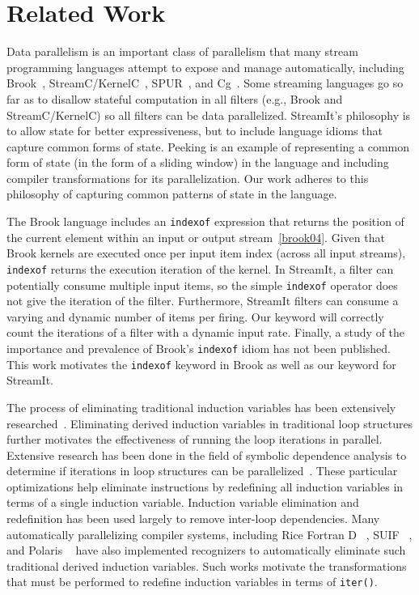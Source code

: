 \section{Related Work}
\label{sec:related}

Data parallelism is an important class of parallelism that many stream
programming languages attempt to expose and manage automatically,
including Brook~\cite{brook04}, StreamC/KernelC~\cite{imagine03ieee},
SPUR~\cite{spur05samos}, and Cg~\cite{cg03}.  Some streaming languages
go so far as to disallow stateful computation in all filters (e.g.,
Brook and StreamC/KernelC) so all filters can be data parallelized.
StreamIt's philosophy is to allow state for better expressiveness, but
to include language idioms that capture common forms of state.
Peeking is an example of representing a common form of state (in the
form of a sliding window) in the language and including compiler
transformations for its parallelization.  Our work adheres to this
philosophy of capturing common patterns of state in the language.

The Brook language includes an {\tt indexof} expression that returns
the position of the current element within an input or output
stream~\ref{brook04}.  Given that Brook kernels are executed once per
input item index (across all input streams), {\tt indexof} returns the
execution iteration of the kernel.  In StreamIt, a filter can
potentially consume multiple input items, so the simple {\tt indexof}
operator does not give the iteration of the filter.  Furthermore,
StreamIt filters can consume a varying and dynamic number of items per
firing.  Our \iter keyword will correctly count the iterations of a
filter with a dynamic input rate. Finally, a study of the importance
and prevalence of Brook's {\tt indexof} idiom has not been published.
This work motivates the {\tt indexof} keyword in Brook as well as our
\iter keyword for StreamIt.

The process of eliminating traditional induction variables has been
extensively researched~\cite{Bacon:1994,RM99:RRV}.  Eliminating
derived induction variables in traditional loop structures further
motivates the effectiveness of running the loop iterations in
parallel.  Extensive research has been done in the field of symbolic
dependence analysis to determine if iterations in loop structures can
be parallelized~\cite{Maydan:1991,Blume:1994}.  These particular
optimizations help eliminate instructions by redefining all induction
variables in terms of a single induction variable.  Induction variable
elimination and redefinition has been used largely to remove
inter-loop dependencies.  Many automatically parallelizing compiler
systems, including Rice Fortran D ~\cite{Hiranandani:1992}, SUIF
~\cite{Wilson:1994}, and Polaris ~\cite{Blume:1996} have also
implemented recognizers to automatically eliminate such traditional
derived induction variables.  Such works motivate the transformations
that must be performed to redefine induction variables in terms of
{\tt iter()}.


